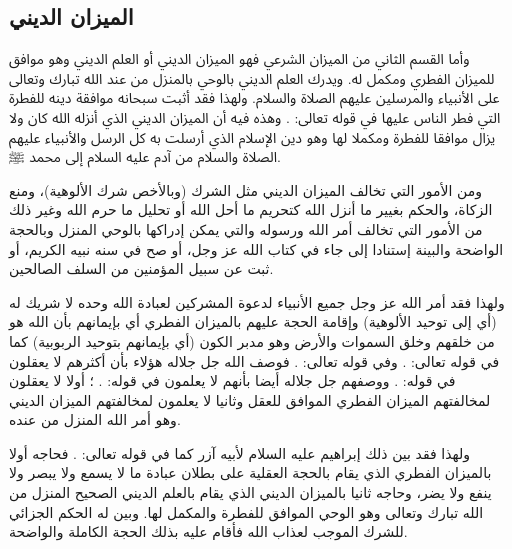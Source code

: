 \subsection{الميزان الديني}

وأما القسم الثاني من الميزان الشرعي فهو الميزان الديني أو العلم الديني وهو موافق للميزان الفطري ومكمل له. ويدرك العلم الديني بالوحي بالمنزل من عند الله تبارك وتعالى على الأنبياء والمرسلين عليهم الصلاة والسلام. ولهذا فقد أثبت سبحانه موافقة دينه للفطرة التي فطر الناس عليها في قوله تعالى: 
\quranayah*[30][30]{\footnotesize \surahname*[30]}. وهذه فيه أن الميزان الديني الذي أنزله الله كان ولا يزال موافقا للفطرة ومكملا لها وهو دين الإسلام الذي أرسلت به كل الرسل والأنبياء عليهم الصلاة والسلام من آدم عليه السلام إلى محمد ﷺ.

ومن الأمور التي تخالف الميزان الديني مثل الشرك (وبالأخص شرك الألوهية)، ومنع الزكاة، والحكم بغيير ما أنزل الله كتحريم ما أحل الله أو تحليل ما حرم الله وغير ذلك من الأمور التي تخالف أمر الله ورسوله والتي يمكن إدراكها بالوحي المنزل وبالحجة الواضحة والبينة إستنادا إلى جاء في كتاب الله عز وجل، أو صح في سنه نبيه الكريم، أو ثبت عن سبيل المؤمنين من السلف الصالحين. 

ولهذا فقد أمر الله عز وجل جميع الأنبياء لدعوة المشركين لعبادة الله وحده لا شريك له (أي إلى توحيد الألوهية) وإقامة الحجة عليهم بالميزان الفطري أي بإيمانهم بأن الله هو من خلقهم وخلق السموات والأرض وهو مدبر الكون (أي بإيمانهم بتوحيد الربوبية) كما في قوله تعالى:
\quranayah*[39][38]{\footnotesize \surahname*[39]}.
وفي قوله تعالى: 
\quranayah*[43][87]{\footnotesize \surahname*[43]}. فوصف الله جل جلاله هؤلاء بأن أكثرهم لا يعقلون في قوله:
\quranayah*[29][63]{\footnotesize \surahname*[29]}.
ووصفهم جل جلاله أيضا بأنهم لا يعلمون في قوله:
\quranayah*[31][25]{\footnotesize \surahname*[31]}.
؛ أولا لا يعقلون لمخالفتهم الميزان الفطري الموافق للعقل وثانيا لا يعلمون لمخالفتهم الميزان الديني وهو أمر الله المنزل من عنده. 

ولهذا فقد بين ذلك إبراهيم عليه السلام لأبيه آزر كما في قوله تعالى:
\quranayah*[19][42-45]{\footnotesize \surahname*[19]}. فحاجه أولا بالميزان الفطري الذي يقام بالحجة العقلية على بطلان عبادة ما لا يسمع ولا يبصر ولا ينفع ولا يضر، وحاجه ثانيا بالميزان الديني الذي يقام بالعلم الديني الصحيح المنزل من الله تبارك وتعالى وهو الوحي الموافق للفطرة والمكمل لها. وبين له الحكم الجزائي للشرك الموجب لعذاب الله فأقام عليه بذلك الحجة الكاملة والواضحة. 

